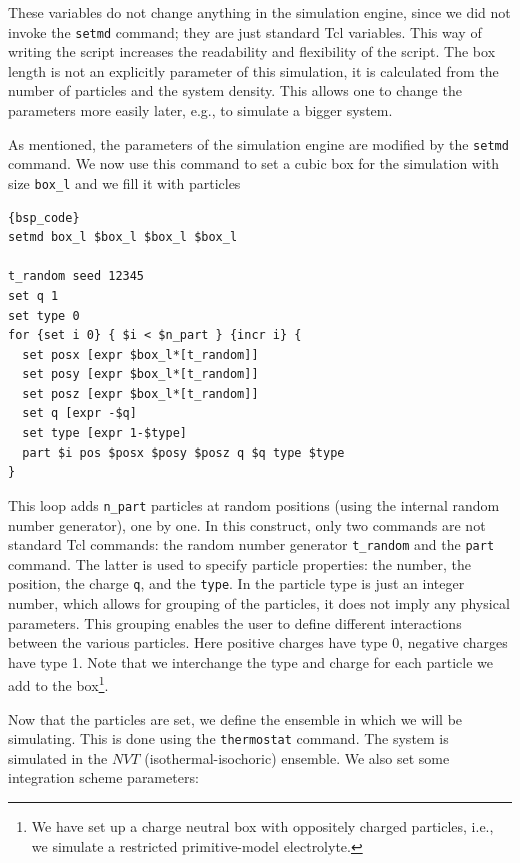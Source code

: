 \documentclass[
a4paper,                        %
11pt,                           %
twoside,                        %
footsepline,                    %
headsepline,                    %
headexclude,                    %
footexclude,                    %
pagesize,                       %
]{scrartcl}
\begin{document}
\noindent These variables do not change anything in the simulation engine, since we did not invoke the \verb|setmd| command; they are just standard Tcl variables. This way of writing the script increases the readability and flexibility of the script. The box length is not an explicitly parameter of this simulation, it is calculated from the number of particles and the system density. This allows one to change the parameters more easily later, e.g., to simulate a bigger system.
 
As mentioned, the parameters of the simulation engine are modified by the \verb|setmd| command. We now use this command to set a cubic box for the simulation with size \verb|box_l| and we fill it with particles

{\small\vspace{0,2cm}
\begin{lstlisting}[firstnumber= auto]{bsp_code}
setmd box_l $box_l $box_l $box_l

t_random seed 12345
set q 1
set type 0
for {set i 0} { $i < $n_part } {incr i} {
  set posx [expr $box_l*[t_random]]
  set posy [expr $box_l*[t_random]]
  set posz [expr $box_l*[t_random]]
  set q [expr -$q]
  set type [expr 1-$type]
  part $i pos $posx $posy $posz q $q type $type
}
\end{lstlisting}\vspace{0,2cm}
}

\noindent This loop adds \verb|n_part| particles at random positions (using the \es{} internal random number generator), one by one. In this construct, only two commands are not standard Tcl commands: the random number generator \verb|t_random| and the \verb|part| command. The latter is used to specify particle properties: the number, the position, the charge \verb|q|, and the \verb|type|. In \es{} the particle type is just an integer number, which allows for grouping of the particles, it does not imply any physical parameters. This grouping enables the user to define different interactions between the various particles. Here positive charges have type 0, negative charges have type 1. Note that we interchange the type and charge for each particle we add to the box\footnote{We have set up a charge neutral box with oppositely charged particles, i.e., we simulate a restricted primitive-model electrolyte.}. 

Now that the particles are set, we define the ensemble in which we will be simulating. This is done using the \verb|thermostat| command. The system is simulated in the $NVT$ (isothermal-isochoric) ensemble. We also set some integration scheme parameters:
\end{document}
